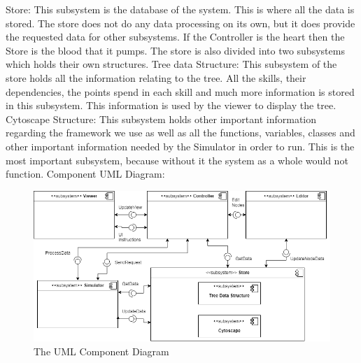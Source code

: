 \documentclass[12pt]{article}
\begin{document}
    Store:\newline
    This subsystem is the database of the system. This is where all the data is stored. The store does not do any data processing on its own, but it does provide the requested data for other subsystems. If the Controller is the heart then the Store is the blood that it pumps. The store is also divided into two subsystems which holds their own structures.\newline
    Tree data Structure:\newline 
    This subsystem of the store holds all the information relating to the tree. All the skills, their dependencies, the points spend in each skill and much more information is stored in this subsystem. This information is used by the viewer to display the tree.\newline
    Cytoscape Structure:\newline 
    This subsystem holds other important information regarding the framework we use as well as all the functions, variables, classes and other important information needed by the Simulator in order to run. This is the most important subsystem, because without it the system as a whole would not function.\newline \newline 
    Component UML Diagram:
  
    \begin{figure}[H]
      \includegraphics[width=\linewidth]{images/TriiUMLComponentDiagram}
      \caption{The UML Component Diagram}
      \label{fig:componentdiagram}
    \end{figure}
  
  
\end{document}
